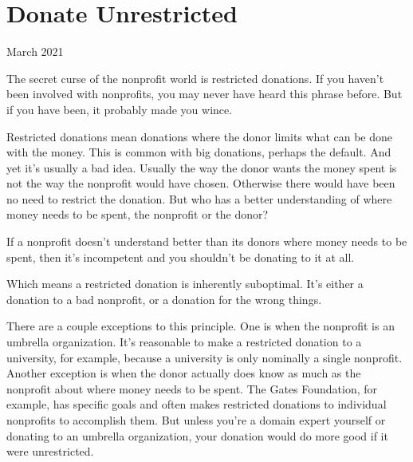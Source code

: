 \chapter{Donate Unrestricted}


            
              
                

March 2021

The secret curse of the nonprofit world
                  is restricted donations. If you haven't been involved with
                  nonprofits, you may never have heard this phrase before. But
                  if you have been, it probably made you wince.

Restricted
                  donations mean donations where the donor limits what can be
                  done with the money. This is common with big donations,
                  perhaps the default. And yet it's usually a bad idea. Usually
                  the way the donor wants the money spent is not the way the
                  nonprofit would have chosen. Otherwise there would have been
                  no need to restrict the donation. But who has a better
                  understanding of where money needs to be spent, the nonprofit
                  or the donor?

If a nonprofit doesn't understand
                  better than its donors where money needs to be spent, then
                  it's incompetent and you shouldn't be donating to it at
                  all.

Which means a restricted donation is
                  inherently suboptimal. It's either a donation to a bad
                  nonprofit, or a donation for the wrong things.

There
                  are a couple exceptions to this principle. One is when the
                  nonprofit is an umbrella organization. It's reasonable to make
                  a restricted donation to a university, for example, because a
                  university is only nominally a single nonprofit. Another
                  exception is when the donor actually does know as much as the
                  nonprofit about where money needs to be spent. The Gates
                  Foundation, for example, has specific goals and often makes
                  restricted donations to individual nonprofits to accomplish
                  them. But unless you're a domain expert yourself or donating
                  to an umbrella organization, your donation would do more good
                  if it were unrestricted.

